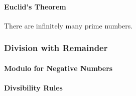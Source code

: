 



\paragraph{Euclid's Theorem} There are infinitely many prime numbers.


\subsubsection{Division with Remainder}
%
% 





\paragraph{Modulo for Negative Numbers}



\paragraph{Divsibility Rules}

